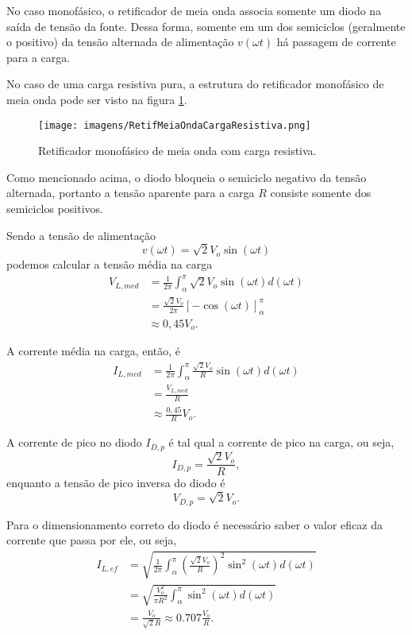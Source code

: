 
No caso monofásico, o retificador de meia onda associa somente um diodo na saída de tensão da fonte. Dessa forma, somente em um dos semiciclos (geralmente o positivo) da tensão alternada de alimentação $v\left( \omega t \right) $ há passagem de corrente para a carga.

No caso de uma carga resistiva pura, a estrutura do retificador monofásico de meia onda pode ser visto na figura \ref{fig:RMMOCR}.

\begin{figure}[h]
\center
\texttt{[image: imagens/RetifMeiaOndaCargaResistiva.png]}
\caption{Retificador monofásico de meia onda com carga resistiva.}
\label{fig:RMMOCR}
\end{figure}

Como mencionado acima, o diodo bloqueia o semiciclo negativo da tensão alternada, portanto a tensão aparente para a carga $R$ consiste somente dos semiciclos positivos.

Sendo a tensão de alimentação \[
v(\omega t)=\sqrt{2}V_o\sin(\omega t) 
\] podemos calcular a tensão média na carga
\begin{align*}
    V_{L,med} &= \frac{1}{2\pi}\int_\alpha^{\pi}\sqrt{2}V_o\sin(\omega t)d(\omega t) \\
	     &= \frac{\sqrt{2}V_o}{2\pi}[-\cos(\omega t)]_\alpha^{\pi} \\
	     &\approx 0,45 V_o
.\end{align*}

A corrente média na carga, então, é
\begin{align*}
    I_{L,med} &= \frac{1}{2\pi}\int_\alpha^{\pi}\frac{\sqrt{2}V_o}{R}\sin(\omega t)d(\omega t) \\
    &= \frac{V_{L,med}}{R} \\
    &\approx \frac{0,45 }{R}V_o
.\end{align*}


A corrente de pico no diodo $I_{D,p}$ é tal qual a corrente de pico na carga, ou seja, \[
I_{D,p} = \frac{\sqrt{2}V_o}{R}
,\] enquanto a tensão de pico inversa do diodo é \[
    V_{D,p} = \sqrt{2}V_o
.\] 

Para o dimensionamento correto do diodo é necessário saber o valor eficaz da corrente que passa por ele, ou seja,
\begin{align*}
    I_{L, ef} &= \sqrt{\frac{1}{2\pi} \int_{\alpha}^{\pi}\left(  \frac{\sqrt{2}V_o}{R}\right) ^{2}\sin^{2}(\omega t)d(\omega t)} \\
&=\sqrt{\frac{V_o^{2}}{\pi R^{2}}\int_{\alpha}^{\pi}\sin^2(\omega t)d(\omega t)} \\
&= \frac{V_o}{\sqrt{2}R} \approx 0.707\frac{V_o}{R}
.\end{align*}

